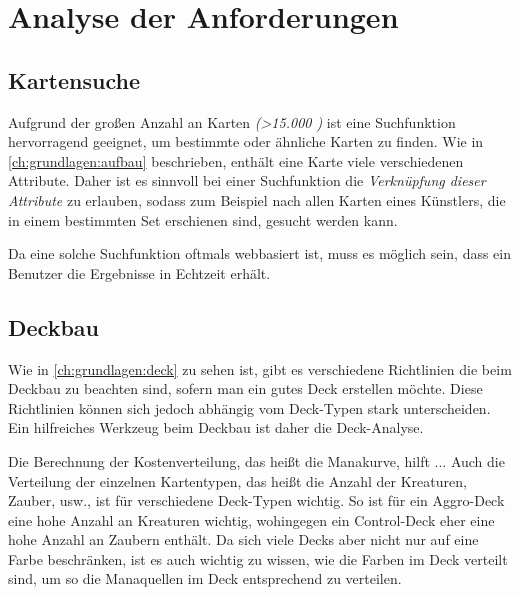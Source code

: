 \section{Analyse der Anforderungen}\label{ch:analyse}

\subsection{Kartensuche}
%    
Aufgrund der großen Anzahl an Karten \emph{(>15.000 \cite{mtgjson})} ist eine Suchfunktion hervorragend geeignet, um bestimmte oder ähnliche Karten zu finden. Wie in \ref{ch:grundlagen:aufbau} beschrieben, enthält eine Karte viele verschiedenen Attribute. Daher ist es sinnvoll bei einer Suchfunktion die \emph{Verknüpfung dieser Attribute} zu erlauben, sodass zum Beispiel nach allen Karten eines Künstlers, die in einem bestimmten Set erschienen sind, gesucht werden kann. 

Da eine solche Suchfunktion oftmals webbasiert ist, muss es möglich sein, dass ein Benutzer die Ergebnisse in Echtzeit erhält.



\subsection{Deckbau}
% 
Wie in \ref{ch:grundlagen:deck} zu sehen ist, gibt es verschiedene Richtlinien die beim Deckbau zu beachten sind, sofern man ein gutes Deck erstellen möchte. Diese Richtlinien können sich jedoch abhängig vom Deck-Typen stark unterscheiden. Ein hilfreiches Werkzeug beim Deckbau ist daher die Deck-Analyse.

Die Berechnung der Kostenverteilung, das heißt die Manakurve, hilft ... %
Auch die Verteilung der einzelnen Kartentypen, das heißt die Anzahl der Kreaturen, Zauber, usw., ist für verschiedene Deck-Typen wichtig. So ist für ein Aggro-Deck eine hohe Anzahl an Kreaturen wichtig, wohingegen ein Control-Deck eher eine hohe Anzahl an Zaubern enthält. Da sich viele Decks aber nicht nur auf eine Farbe beschränken, ist es auch wichtig zu wissen, wie die Farben im Deck verteilt sind, um so die Manaquellen im Deck entsprechend zu verteilen. 

